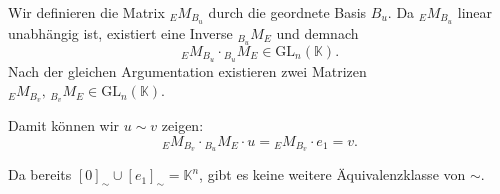 \documentclass[a4paper,12pt]{article}
\begin{document}
Wir definieren die Matrix ${}_E M_{B_u}$ durch die geordnete Basis $B_u$. Da ${}_E M_{B_u}$ linear unabhängig ist, existiert eine Inverse ${}_{B_u} M_E$ und demnach
\[
  {}_E M_{B_u} \cdot {}_{B_u} M_E \in \mathrm{GL}_n(\mathbb{K}).
\]
Nach der gleichen Argumentation existieren zwei Matrizen ${}_E M_{B_v},\, {}_{B_v} M_E \in \mathrm{GL}_n(\mathbb{K})$.

Damit können wir $u \sim v$ zeigen:
\[
  {}_E M_{B_v} \cdot {}_{B_u} M_E \cdot u = {}_E M_{B_v} \cdot e_1 = v.
\]

Da bereits $[0]_{\sim} \cup [e_1]_{\sim} = \mathbb{K}^n$, gibt es keine weitere Äquivalenzklasse von $\sim$.
\end{document}
